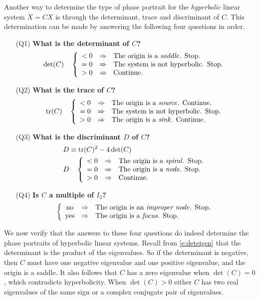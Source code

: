\documentclass{ximera}
\begin{document}
Another way to determine the type of phase portrait for the
{\em hyperbolic\/} linear system $\dot{X}=CX$ is through the
determinant, trace and
discriminant of $C$. This determination can be made by
answering the following four questions in order.
\begin{itemize}
\item[(Q1)]  {\bf What is the determinant of $C$?}
\[
\det(C) \quad \left\{\begin{array}{ccl}
< 0 & \Rightarrow & \mbox{The origin is a {\em saddle\/}. Stop.}  \\
= 0 	& \Rightarrow & \mbox{The system is not hyperbolic. Stop.}  \\
> 0 & \Rightarrow & \mbox{Continue.}  \end{array}\right.
\]
\item[(Q2)]  {\bf What is the trace of $C$?}
\[
{\rm tr}(C) \quad \left\{\begin{array}{ccl}
< 0 & \Rightarrow & \mbox{The origin is a {\em source\/}. Continue.}  \\
= 0 	& \Rightarrow & \mbox{The system is not hyperbolic. Stop.}  \\
> 0 & \Rightarrow & \mbox{The origin is a {\em sink\/}. Continue.}
\end{array}\right.
\]
\item[(Q3)]  {\bf What is the discriminant $D$ of $C$?}
\begin{align*}
  D &\equiv {\rm tr}(C)^2-4\det(C)  \\
  D &\quad \left\{\begin{array}{ccl}
< 0 & \Rightarrow & \mbox{The origin is a {\em spiral\/}. Stop.}  \\
= 0 & \Rightarrow & \mbox{The origin is a {\em node\/}. Stop.} \\
> 0 	& \Rightarrow & \mbox{Continue.}
                  \end{array}\right.
\end{align*}
\item[(Q4)]  {\bf Is $C$ a multiple of $I_2$?}
\[
\left\{\begin{array}{ccl}
\text{no} & \Rightarrow & \mbox{The origin is an {\em improper node\/}. Stop.}  \\
\text{yes} & \Rightarrow & \mbox{The origin is a {\em focus\/}. Stop.}
\end{array}\right.
\]
\end{itemize}

We now verify that the answers to these four questions do indeed
determine the phase portraits of hyperbolic linear systems.  Recall
from \eqref{e:deteigen} that the determinant is the product of the
eigenvalues.  So if the determinant is negative, then $C$ must have
one negative eigenvalue and one positive eigenvalue, and the origin
is a saddle.  It also follows that $C$ has a zero eigenvalue when
$\det(C)=0$, which contradicts hyperbolicity.  When $\det(C)>0$
either $C$ has two real eigenvalues of the same sign or a complex
conjugate pair of eigenvalues.
\end{document}
